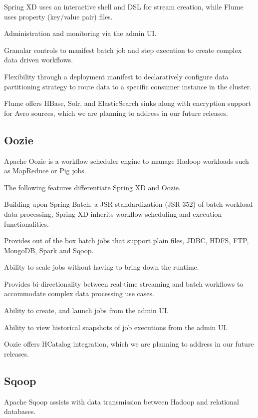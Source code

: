 \begin{itemize*}
\item Spring XD uses an interactive shell and DSL for stream creation,
while Flume uses property (key/value pair) files.
\item Administration and monitoring via the admin UI.
\item Granular controls to manifest batch job and step execution to create
complex data driven workflows.
\item Flexibility through a deployment manifest to declaratively configure data
partitioning strategy to route data to a specific consumer instance in the cluster.
\end{itemize*}

Flume offers HBase, Solr, and ElasticSearch sinks along with encryption support
for Avro sources, which we are planning to address in our future releases.

\subsection{Oozie}
Apache Oozie\cite{oozie} is a workflow scheduler engine to manage Hadoop \cite{hadoop}
workloads such as MapReduce or Pig jobs.

The following features differentiate Spring XD and Oozie.

\begin{itemize*}
\item Building upon Spring Batch, a JSR standardization (JSR-352) of batch
workload data processing, Spring XD inherits workflow scheduling and execution
functionalities.
\item Provides out of the box batch jobs that support plain files, JDBC, HDFS,
FTP, MongoDB, Spark and Sqoop.
\item Ability to scale jobs without having to bring down the runtime.
\item Provides bi-directionality between real-time streaming and batch
workflows to accommodate complex data processing use cases.
\item Ability to create, and launch jobs from the admin UI.
\item Ability to view historical snapshots of job executions from the admin UI.
\end{itemize*}

Oozie offers HCatalog integration, which we are planning to address in our
future releases.

\subsection{Sqoop}
Apache Sqoop\cite{sqoop} assists with data transmission between Hadoop and relational
databases.

